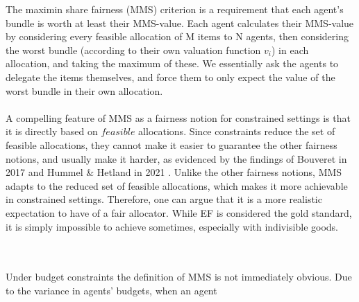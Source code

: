 \documentclass[b5paper]{article}
\begin{document}
The maximin share fairness (MMS) criterion is a requirement that each agent's bundle is worth at least their MMS-value.
Each agent calculates their MMS-value by considering every feasible allocation of M items to N agents, then considering the worst bundle (according to their own valuation function $v_i$) in each allocation, and taking the maximum of these.
We essentially ask the agents to delegate the items themselves, and force them to only expect the value of the worst bundle in their own allocation.
\\ \\
A compelling feature of MMS as a fairness notion for constrained settings is that it is directly based on $feasible$ allocations.
Since constraints reduce the set of feasible allocations, they cannot make it easier to guarantee the other fairness notions, and usually make it harder, as evidenced by the findings of Bouveret in 2017 \cite{bouveret_fair_2017} and Hummel \& Hetland in 2021 \cite{hummel_fair_2021}.
Unlike the other fairness notions, MMS adapts to the reduced set of feasible allocations, which makes it more achievable in constrained settings.
Therefore, one can argue that it is a more realistic expectation to have of a fair allocator.
While EF is considered the gold standard, it is simply impossible to achieve sometimes, especially with indivisible goods.

\\ \\
Under budget constraints the definition of MMS is not immediately obvious.
Due to the variance in agents' budgets, when an agent 
\end{document}

